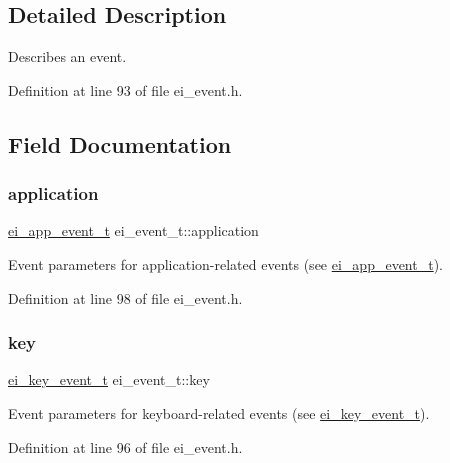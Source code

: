 \subsection{Detailed Description}
Describes an event. 

Definition at line 93 of file ei\+\_\+event.\+h.



\subsection{Field Documentation}
\mbox{\label{structei__event__t_ab93b7dc04597613a3bd0195e74a9f7bb}} 
\subsubsection{\texorpdfstring{application}{application}}
{\footnotesize\ttfamily \hyperlink{structei__app__event__t}{ei\+\_\+app\+\_\+event\+\_\+t} ei\+\_\+event\+\_\+t\+::application}



Event parameters for application-\/related events (see \hyperlink{structei__app__event__t}{ei\+\_\+app\+\_\+event\+\_\+t}). 



Definition at line 98 of file ei\+\_\+event.\+h.

\mbox{\label{structei__event__t_a0f146bb41b78f27e18ecccc71f50026d}} 
\subsubsection{\texorpdfstring{key}{key}}
{\footnotesize\ttfamily \hyperlink{structei__key__event__t}{ei\+\_\+key\+\_\+event\+\_\+t} ei\+\_\+event\+\_\+t\+::key}



Event parameters for keyboard-\/related events (see \hyperlink{structei__key__event__t}{ei\+\_\+key\+\_\+event\+\_\+t}). 



Definition at line 96 of file ei\+\_\+event.\+h.

\mbox{\label{structei__event__t_a7f0b0d0cf765a822aca7a435510d9d85}} 
